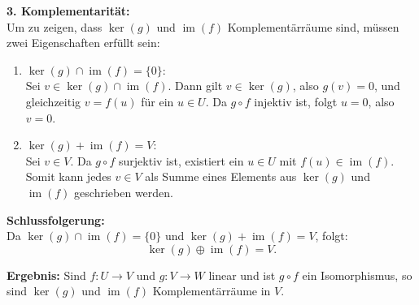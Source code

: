 \documentclass[11pt]{article}
\begin{document}
\textbf{3. Komplementarität:} \\
Um zu zeigen, dass \( \ker(g) \) und \( \operatorname{im}(f) \) Komplementärräume sind, müssen zwei Eigenschaften erfüllt sein:
\begin{enumerate}
    \item \( \ker(g) \cap \operatorname{im}(f) = \{0\} \): \\
    Sei \( v \in \ker(g) \cap \operatorname{im}(f) \). Dann gilt \( v \in \ker(g) \), also \( g(v) = 0 \), und gleichzeitig \( v = f(u) \) für ein \( u \in U \). Da \( g \circ f \) injektiv ist, folgt \( u = 0 \), also \( v = 0 \).
    \item \( \ker(g) + \operatorname{im}(f) = V \): \\
    Sei \( v \in V \). Da \( g \circ f \) surjektiv ist, existiert ein \( u \in U \) mit \( f(u) \in \operatorname{im}(f) \). Somit kann jedes \( v \in V \) als Summe eines Elements aus \( \ker(g) \) und \( \operatorname{im}(f) \) geschrieben werden.
\end{enumerate}

\textbf{Schlussfolgerung:} \\
Da \( \ker(g) \cap \operatorname{im}(f) = \{0\} \) und \( \ker(g) + \operatorname{im}(f) = V \), folgt:
\[
\ker(g) \oplus \operatorname{im}(f) = V.
\]

\textbf{Ergebnis:} Sind \( f: U \to V \) und \( g: V \to W \) linear und ist \( g \circ f \) ein Isomorphismus, so sind \( \ker(g) \) und \( \operatorname{im}(f) \) Komplementärräume in \( V \).




\end{document}
